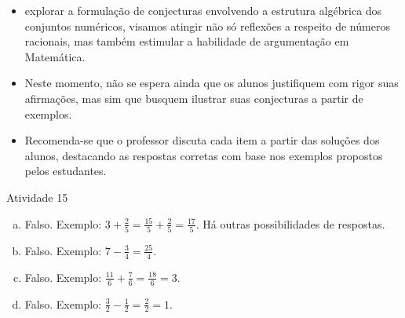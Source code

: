 \begin{multicols}{2}
  \begin{itemize} %
    \item       explorar a formulação de conjecturas envolvendo a estrutura algébrica dos conjuntos numéricos, visamos atingir não só reflexões a respeito de números racionais, mas também estimular a habilidade de argumentação em Matemática.
\end{itemize} %


   \vspace{.15cm}

  \begin{itemize} %
    \item       Neste momento, não se espera ainda que os alunos justifiquem com rigor suas afirmações, mas sim que busquem ilustrar suas conjecturas a partir de exemplos.
    \item       Recomenda-se que o professor discuta cada item a partir das soluções dos alunos, destacando as respostas corretas com base nos exemplos propostos pelos estudantes.
\end{itemize} %


\begin{resposta*}{Atividade 15}

\begin{enumerate} [a)] %
    \item       Falso. Exemplo: $3 + \frac{2}{5} = \frac{15}{5}+\frac{2}{5} = \frac{17}{5}$.  Há outras possibilidades de respostas.
    \item       Falso. Exemplo:       $7 - \frac{3}{4} = \frac{25}{4}$.
    \item       Falso. Exemplo:       $\frac{11}{6} + \frac{7}{6} = \frac{18}{6} = 3$.
    \item       Falso. Exemplo:       $\frac{3}{2} - \frac{1}{2} = \frac{2}{2} = 1$.
\end{enumerate} %


\end{resposta*}

\end{multicols}
